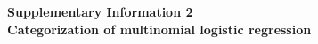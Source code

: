 \documentclass[12pt,a4paper]{article}
\date{}
\begin{document}

\begin{flushleft}
{\Large
\textbf{Supplementary Information 2 \\ Categorization of multinomial logistic regression \\}
}
%

\end{flushleft}

\end{document}
